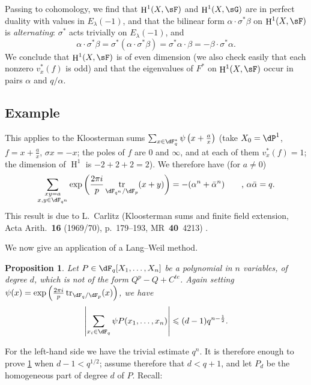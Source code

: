 \documentclass[oneside]{book}
\DeclareMathOperator{\h}{H}
\DeclareMathOperator{\tr}{tr}
\theoremstyle{sga-source}
\theoremstyle{sga-source-dash}
\theoremstyle{sga-source-dotdash}
\theoremstyle{sga-source-number-note-dash}
\theoremstyle{sga-source-note-number-dotdash}
\theoremstyle{sga-source-example-dotdash}
\theoremstyle{sga-source-inline-number}
\theoremstyle{sga-source-bare-number}
\theoremstyle{sga-source}
\newtheorem{proposition_}[subsection]{Proposition}
\newcommand{\PrintPage}[1]{}\newcommand{\MathPage}[1]{}\newcommand{\PrintCite}[2]{#1}\newcommand{\var}[3]{#2}
\begin{document}
Passing to cohomology, we find that $\h^1(X,\sF)$ and $\h^1(X,\sG)$ are in 
\var{perfect duality with values in $E_\lambda(1)$}{perfect duality with values in $E_\lambda(-1)$}{S45-SOL-0780}, and that the bilinear form 
$\alpha\cdot \sigma^\ast\beta$ on $\h^1(X,\sF)$ is \emph{alternating}: 
\var{$\sigma^\ast$ acts trivially on $E_\lambda(1)$}{$\sigma^\ast$ acts trivially on $E_\lambda(-1)$}{S45-SOL-0781}, and 
\[
  \alpha\cdot \sigma^\ast \beta = \sigma^\ast(\alpha\cdot \sigma^\ast \beta) = \sigma^\ast \alpha\cdot \beta = -\beta\cdot \sigma^\ast \alpha \text{.} 
\]
We conclude that $\h^1(X,\sF)$ is of even dimension (we also check 
    easily that each nonzero $v_x^\ast(f)$ is odd) and that the 
eigenvalues of $F^\ast$ on $\h^1(X,\sF)$ occur in pairs $\alpha$ and 
$q/\alpha$. 





\PrintPage{193}
\subsection{Example}\label{VI:3-7}

This applies to the Kloosterman sums 
$\sum_{x\in \dF_q^\ast} \psi\left(x+\frac a x\right)$ (take 
$X_0=\dP^1$, $f=x+\frac a x$, $\sigma x=-x$; the poles of $f$ are $0$ and 
$\infty$, and at each of them $v_x^\ast(f)=1$; the dimension of $\h^1$ is 
$-2+2+2=2$). We therefore have (for $a\ne 0$) 
\[
  \sum_{\substack{x y=a \\ x,y\in \dF_{q^n}}} \exp\left(\frac{2\pi i}{p} \tr_{\dF_{q^n}/\dF_p}(x+y)\right) = -(\alpha^n+\bar\alpha^n) \qquad \text{, }\alpha\bar \alpha = q \text{.} 
\]
This result is due to L.\ Carlitz (Kloosterman sums and finite field extension, Acta Arith.~\textbf{16} (1969/70), p.~179--193, MR~\textbf{40}~4213) \cite{ca69}. 

We now give an application of a Lang--Weil method. 





\begin{proposition_}\label{VI:3-8}
Let $P\in \dF_q[X_1,\dots,X_n]$ be a polynomial in $n$ variables, of degree 
$d$, which is not of the form $Q^p-Q+C^{te}$. Again setting 
$\psi(x) = \exp\left(\frac{2\pi i}{p} \tr_{\dF_q/\dF_p}(x)\right)$, we have 
\[
  \left|\sum_{x_i\in \dF_q} \psi P(x_1,\dots,x_n)\right| \leqslant (d-1) q^{n-\frac 1 2} \text{.}
\]
\end{proposition_}

For the left-hand side we have the trivial estimate $q^n$. It is therefore enough to 
prove \ref{VI:3-8} when $d-1<q^{1/2}$; assume therefore that 
$d<q+1$, and let $P_d$ be the homogeneous part of degree $d$ of $P$. Recall: 
\end{document}
